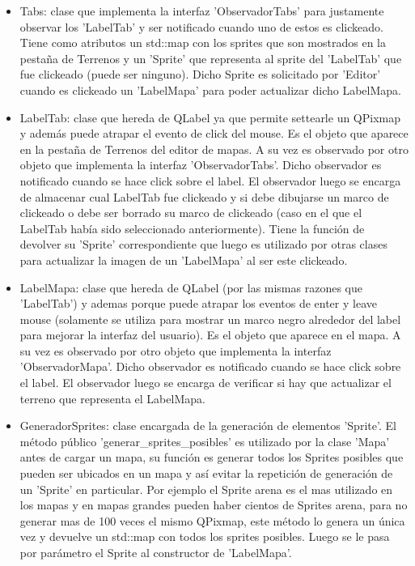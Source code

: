\documentclass[titlepage,a4paper,12pt]{article}
\begin{document}
\begin{itemize}
\item Tabs: clase que implementa la interfaz 'ObservadorTabs' para justamente observar los 'LabelTab' y ser notificado cuando uno de estos es clickeado. Tiene como atributos un std::map con los sprites que son mostrados en la pestaña de Terrenos y un 'Sprite' que representa al sprite del 'LabelTab' que fue clickeado (puede ser ninguno). Dicho Sprite es solicitado por 'Editor' cuando es clickeado un 'LabelMapa' para poder actualizar dicho LabelMapa.

\item LabelTab: clase que hereda de QLabel ya que permite settearle un QPixmap y además puede atrapar el evento de click del mouse. Es el objeto que aparece en la pestaña de Terrenos del editor de mapas. A su vez es observado por otro objeto que implementa la interfaz 'ObservadorTabs'. Dicho observador es notificado cuando se hace click sobre el label. El observador luego se encarga de almacenar cual LabelTab fue clickeado y si debe dibujarse un marco de clickeado o debe ser borrado su marco de clickeado (caso en el que el LabelTab había sido seleccionado anteriormente). Tiene la función de devolver su 'Sprite' correspondiente que luego es utilizado por otras clases para actualizar la imagen de un 'LabelMapa' al ser este clickeado.

\item LabelMapa: clase que hereda de QLabel (por las mismas razones que 'LabelTab') y ademas porque puede atrapar los eventos de enter y leave mouse (solamente se utiliza para mostrar un marco negro alrededor del label para mejorar la interfaz del usuario). Es el objeto que aparece en el mapa. A su vez es observado por otro objeto que implementa la interfaz 'ObservadorMapa'. Dicho observador es notificado cuando se hace click sobre el label. El observador luego se encarga de verificar si hay que actualizar el terreno que representa el LabelMapa.


\item GeneradorSprites: clase encargada de la generación de elementos 'Sprite'. El método público 'generar\_sprites\_posibles' es utilizado por la clase 'Mapa' antes de cargar un mapa, su función es generar todos los Sprites posibles que pueden ser ubicados en un mapa y así evitar la repetición de generación de un 'Sprite' en particular. Por ejemplo el Sprite arena es el mas utilizado en los mapas y en mapas grandes pueden haber cientos de Sprites arena, para no generar mas de 100 veces el mismo QPixmap, este método lo genera un única vez y devuelve un std::map con todos los sprites posibles. Luego se le pasa por parámetro el Sprite al constructor de 'LabelMapa'.\\


\end{itemize}
\end{document}
